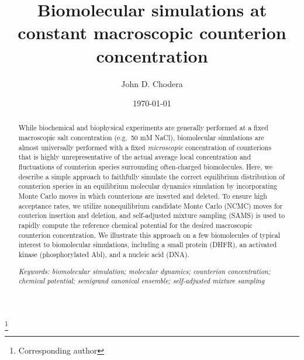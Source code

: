 \documentclass[aps,pre,twocolumn,nofootinbib,superscriptaddress,linenumbers,11point]{revtex4-1}
\begin{document}

\title{Biomolecular simulations at constant macroscopic counterion concentration}

\author{John D. Chodera}
 \thanks{Corresponding author}

\date{\today}


\begin{abstract}

While biochemical and biophysical experiments are generally performed at a fixed macroscopic salt concentration (e.g.~50 mM NaCl), biomolecular simulations are almost universally performed with a fixed \emph{microscopic} concentration of counterions that is highly unrepresentative of the actual average local concentration and fluctuations of counterion species surrounding often-charged biomolecules.
Here, we describe a simple approach to faithfully simulate the correct equilibrium distribution of counterion species in an equilibrium molecular dynamics simulation by incorporating Monte Carlo moves in which counterions are inserted and deleted.
To ensure high acceptance rates, we utilize nonequilibrium candidate Monte Carlo (NCMC) moves for couterion insertion and deletion, and self-adjusted mixture sampling (SAMS) is used to rapidly compute the reference chemical potential for the desired macroscopic counterion concentration.
We illustrate this approach on a few biomolecules of typical interest to biomolecular simulations, including a small protein (DHFR), an activated kinase (phosphorylated Abl), and a nucleic acid (DNA).

\emph{Keywords: biomolecular simulation; molecular dynamics; counterion concentration; chemical potential; semigrand canonical ensemble; self-adjusted mixture sampling}

\end{abstract}

\maketitle
\end{document}
